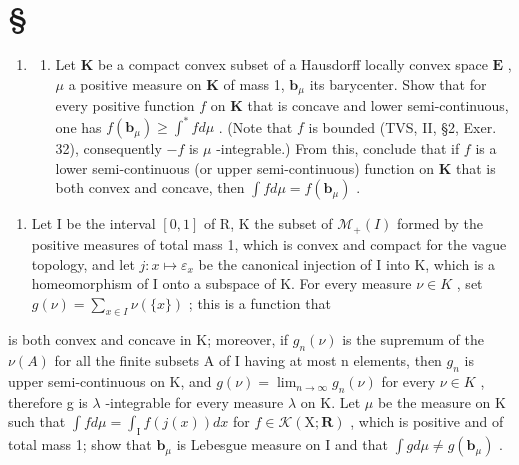 \section*{\texorpdfstring{\S\CurrentExerciseGroup}{Section \CurrentExerciseGroup}}
{}

\begin{enumerate}
\def\labelenumi{\arabic{enumi})}
\tightlist
\item
  \begin{enumerate}
  \def\labelenumii{\alph{enumii})}
  \tightlist
  \item
    Let \(\mathbf{K}\) be a compact convex subset of a Hausdorff locally convex space \(\mathbf{E}\) , \(\mu\) a positive measure on \(\mathbf{K}\) of mass 1, \(\mathbf{b}_{\mu}\) its barycenter. Show that for every positive function \(f\) on \(\mathbf{K}\) that is concave and lower semi-continuous, one has \(f(\mathbf{b}_{\mu}) \geqslant \int^{*} f d\mu\) . (Note that \(f\) is bounded (TVS, II, §2, Exer. 32), consequently \(-f\) is \(\mu\) -integrable.) From this, conclude that if \(f\) is a lower semi-continuous (or upper semi-continuous) function on \(\mathbf{K}\) that is both convex and concave, then \(\int f d\mu = f(\mathbf{b}_{\mu})\) .
  \end{enumerate}
\end{enumerate}

\begin{enumerate}
\def\labelenumi{\alph{enumi})}
\setcounter{enumi}{1}
\tightlist
\item
  Let I be the interval \([0,1]\) of R, K the subset of \(\mathcal{M}_{+}(I)\) formed by the positive measures of total mass 1, which is convex and compact for the vague topology, and let \(j: x \mapsto \varepsilon_{x}\) be the canonical injection of I into K, which is a homeomorphism of I onto a subspace of K. For every measure \(\nu \in K\) , set \(g(\nu) = \sum_{x \in I} \nu(\{x\})\) ; this is a function that
\end{enumerate}

is both convex and concave in K; moreover, if \(g_{n}(\nu)\) is the supremum of the \(\nu(A)\) for all the finite subsets A of I having at most n elements, then \(g_{n}\) is upper semi-continuous on K, and \(g(\nu) = \lim_{n \to \infty} g_{n}(\nu)\) for every \(\nu \in K\) , therefore g is \(\lambda\) -integrable for every measure \(\lambda\) on K. Let \(\mu\) be the measure on K such that \(\int f d\mu = \int_{\mathrm{I}} f(j(x)) dx\) for \(f \in \mathcal{K}(\mathrm{X}; \mathbf{R})\) , which is positive and of total mass 1; show that \(\mathbf{b}_{\mu}\) is Lebesgue measure on I and that \(\int g d\mu \neq g(\mathbf{b}_{\mu})\) .

